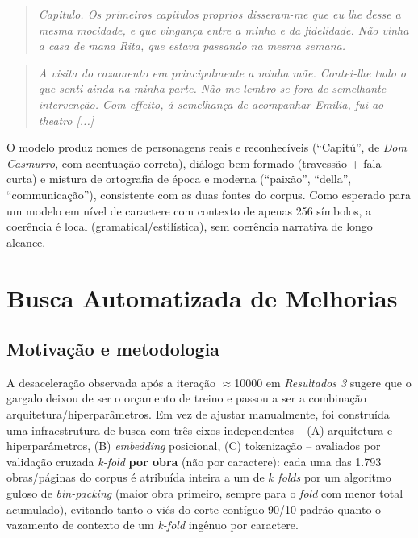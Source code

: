 \documentclass[conference]{IEEEtran}
\begin{document}
\begin{quote}
\small\itshape
Capitulo. Os primeiros capitulos proprios disseram-me que eu lhe desse a
mesma mocidade, e que vingança entre a minha e da fidelidade. Não vinha a
casa de mana Rita, que estava passando na mesma semana.
\end{quote}

\begin{quote}
\small\itshape
A visita do cazamento era principalmente a minha mãe. Contei-lhe tudo o que
senti ainda na minha parte. Não me lembro se fora de semelhante
intervenção. Com effeito, á semelhança de acompanhar Emilia, fui ao
theatro [...]
\end{quote}

O modelo produz nomes de personagens reais e reconhecíveis (``Capitú'', de
\textit{Dom Casmurro}, com acentuação correta), diálogo bem formado
(travessão + fala curta) e mistura de ortografia de época e moderna
(``paixão'', ``della'', ``communicação''), consistente com as duas fontes do
corpus. Como esperado para um modelo em nível de caractere com contexto de
apenas 256 símbolos, a coerência é local (gramatical/estilística), sem
coerência narrativa de longo alcance.

\section{Busca Automatizada de Melhorias}
\label{sec:busca}

\subsection{Motivação e metodologia}

A desaceleração observada após a iteração $\approx$10000 em
\textit{Resultados 3} sugere que o gargalo deixou de ser o orçamento de
treino e passou a ser a combinação arquitetura/hiperparâmetros. Em vez de
ajustar manualmente, foi construída uma infraestrutura de busca com três eixos
independentes -- (A) arquitetura e hiperparâmetros, (B) \textit{embedding}
posicional, (C) tokenização -- avaliados por validação cruzada \textit{k-fold}
\textbf{por obra} (não por caractere): cada uma das 1.793 obras/páginas do
corpus é atribuída inteira a um de $k$ \textit{folds} por um algoritmo guloso
de \textit{bin-packing} (maior obra primeiro, sempre para o \textit{fold} com
menor total acumulado), evitando tanto o viés do corte contíguo 90/10 padrão
quanto o vazamento de contexto de um \textit{k-fold} ingênuo por caractere.
\end{document}
